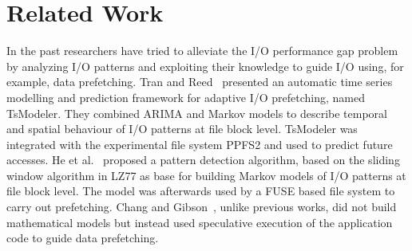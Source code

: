 \section{Related Work}
\label{sec: mercury_related_work}

In the past researchers have tried to alleviate the I/O performance gap problem by analyzing I/O patterns and exploiting their knowledge to guide I/O using, for example, data prefetching. Tran and Reed~\cite{TranR04} presented an automatic time series modelling and prediction framework for adaptive I/O prefetching, named TsModeler. They combined ARIMA and Markov models to describe temporal and spatial behaviour of I/O patterns at file block level. TsModeler was integrated with the experimental file system PPFS2 and used to predict future accesses. %
He et al.~\cite{HEBTAGGMCS13} proposed a pattern detection algorithm, based on the sliding window algorithm in LZ77 as base for building Markov models of I/O patterns at file block level. The model was afterwards used by a FUSE based file system to carry out prefetching. Chang and Gibson~\cite{ChangG99}, unlike previous works, did not build mathematical models but instead used speculative execution of the application code to guide data prefetching.  

